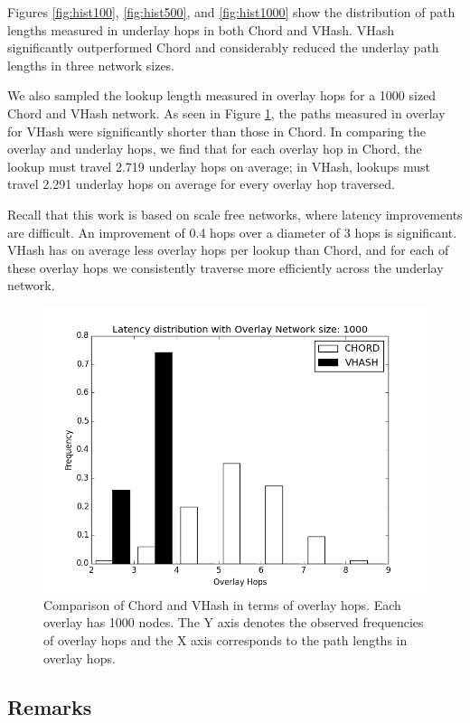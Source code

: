 Figures \ref{fig:hist100}, \ref{fig:hist500}, and \ref{fig:hist1000} show the distribution of path lengths measured in underlay hops in both Chord and VHash.
VHash significantly outperformed Chord and considerably reduced the underlay path lengths in three network sizes.

We also sampled the lookup length measured in overlay hops for a 1000 sized Chord and VHash network.
As seen in Figure \ref{fig:histover}, the paths measured in overlay for VHash were significantly shorter than those in Chord.
In comparing the overlay and underlay hops, we find that for each overlay hop in Chord, the lookup must travel 2.719 underlay hops on average; in VHash, lookups must travel 2.291 underlay hops on average for every overlay hop traversed.

Recall that this work is based on scale free networks, where latency improvements are difficult.
An improvement of 0.4 hops over a diameter of 3 hops is significant.
VHash has on average less overlay hops per lookup than Chord, and for each of these overlay hops we consistently traverse more efficiently across the underlay network.
\begin{figure}[h]
	\centering
	\includegraphics[width=\linewidth]{figs/hist_overlay_4d}
	\caption{Comparison of Chord and VHash in terms of overlay hops.  Each overlay has 1000 nodes.  The Y axis denotes the observed frequencies of overlay hops and the X axis corresponds to the path lengths in overlay hops.}
	\label{fig:histover}
\end{figure}




\subsection{Remarks}


